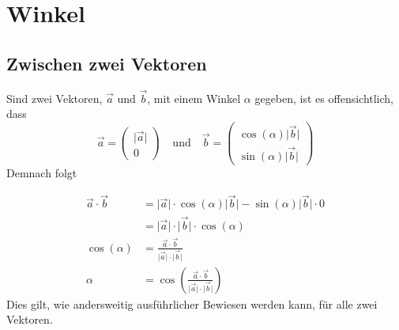 \documentclass{article}
\begin{document}
   
\newcommand{\norm}[1]{\big| {#1} \big|}  
\newcommand{\vect}[1]{\overrightarrow{#1}} 
  
\section{Winkel}
\subsection{Zwischen zwei Vektoren} 
\begin{minipage}[t]{\dimexpr\textwidth-3cm} 
Sind zwei Vektoren, $\vect{a}$ und $\vect{b}$, mit einem Winkel $\alpha$ gegeben, ist es offensichtlich, dass
\[
 \vect{a} = \begin{pmatrix} \norm{\vect{a}} \\ 0 \end{pmatrix}
 \quad \text{und} \quad 
 \vect{b} = \begin{pmatrix} \cos(\alpha) \norm{\vect{b}} \\ \sin(\alpha) \norm{\vect{b}} \end{pmatrix}
\]
Demnach folgt
\end{minipage} 
\hfill
\begin{minipage}[t]{3cm} 
 \centering 
\end{minipage}
\begin{align*}
 \vect{a} \cdot \vect{b} &= \norm{\vect{a}} \cdot \cos(\alpha) \norm{\vect{b}} - \sin(\alpha) \norm{\vect{b}} \cdot 0 \\
 &= \norm{\vect{a}} \cdot \norm{\vect{b}} \cdot \cos(\alpha) \\
 \cos(\alpha) &= \frac{\vect{a} \cdot \vect{b}}{\norm{\vect{a}} \cdot  
\norm{\vect{b}}} \\
 \alpha &= \cos\left({\frac{\vect{a} \cdot \vect{b}}{\norm{\vect{a}} \cdot  \norm{\vect{b}}}}\right)
\end{align*}
Dies gilt, wie andersweitig ausführlicher Bewiesen werden kann, für alle zwei Vektoren.
 
\end{document}
